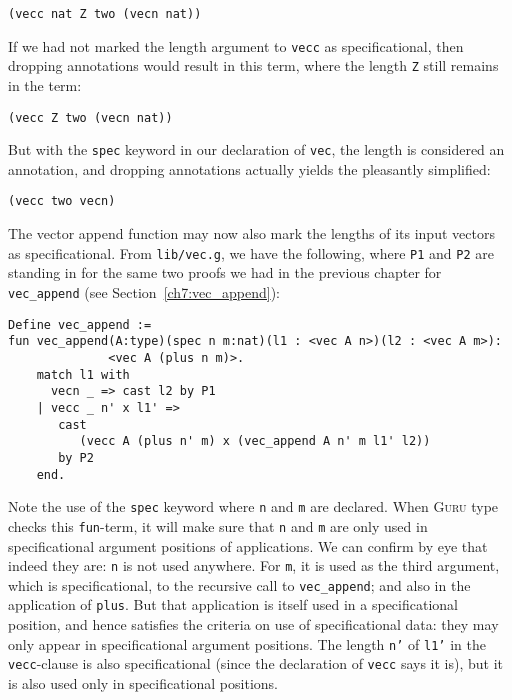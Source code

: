 \documentclass{book}[12pt]
\newcommand{\guru}[0]{\textsc{Guru}\xspace}
\begin{document}
\begin{verbatim}
(vecc nat Z two (vecn nat))
\end{verbatim}

\noindent If we had not marked the length argument to \texttt{vecc} as
specificational, then dropping annotations would result in this term,
where the length \texttt{Z} still remains in the term:

\begin{verbatim}
(vecc Z two (vecn nat))
\end{verbatim}

\noindent But with the \texttt{spec} keyword in our declaration of
\texttt{vec}, the length is considered an annotation, and dropping
annotations actually yields the pleasantly simplified:

\begin{verbatim}
(vecc two vecn)
\end{verbatim}

The vector append function may now also mark the lengths of its input
vectors as specificational.  From \texttt{lib/vec.g}, we have the
following, where \texttt{P1} and \texttt{P2} are standing in for the
same two proofs we had in the previous chapter for
\texttt{vec\_append} (see Section~\ref{ch7:vec_append}):

\begin{verbatim}
Define vec_append :=
fun vec_append(A:type)(spec n m:nat)(l1 : <vec A n>)(l2 : <vec A m>):
              <vec A (plus n m)>.
    match l1 with
      vecn _ => cast l2 by P1
    | vecc _ n' x l1' => 
       cast
          (vecc A (plus n' m) x (vec_append A n' m l1' l2)) 
       by P2
    end.
\end{verbatim}

\noindent Note the use of the \texttt{spec} keyword where \texttt{n}
and \texttt{m} are declared.  When \guru type checks this
\texttt{fun}-term, it will make sure that \texttt{n} and \texttt{m}
are only used in specificational argument positions of applications.
We can confirm by eye that indeed they are: \texttt{n} is not used
anywhere.  For \texttt{m}, it is used as the third argument, which is
specificational, to the recursive call to \texttt{vec\_append}; and
also in the application of \texttt{plus}.  But that application is
itself used in a specificational position, and hence satisfies the
criteria on use of specificational data: they may only appear in
specificational argument positions.  The length \texttt{n'} of
\texttt{l1'} in the \texttt{vecc}-clause is also specificational
(since the declaration of \texttt{vecc} says it is), but it is also
used only in specificational positions.
\end{document}
